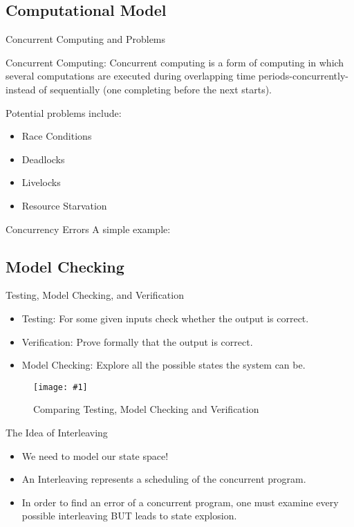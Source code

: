 \documentclass[9pt]{beamer}
\newcommand{\trace}[2]{
\begin{figure}[H]
\centering
\texttt{[image: \#1]}
\caption{#2}
\label{#2}
\end{figure}
}
\newcommand{\Code}[2]{
  \begin{minipage}{\linewidth}
  
  \label{#2}
  \end{minipage}
 }
\begin{document}
\subsection{Computational Model}
\begin{frame}{Concurrent Computing and Problems}

Concurrent Computing: Concurrent computing is a form of computing in which several computations are executed during
overlapping time periods-concurrently-instead of sequentially (one completing before the next starts).

Potential problems include:
\begin{itemize}
\item Race Conditions
\item Deadlocks
\item Livelocks
\item Resource Starvation
\end{itemize}

\end{frame}

\begin{frame}{Concurrency Errors}
A simple example:

\Code{../code/zero.c}{Example of non-concurrency error}

\Code{../code/zeroconc.c}{Example of concurrency error}

\end{frame}

\subsection{Model Checking}
\begin{frame}{Testing, Model Checking, and Verification}
\begin{itemize}
\item Testing: For some given inputs check whether the output is correct.
\item Verification: Prove formally that the output is correct.
\item Model Checking: Explore all the possible states the system can be.

\end{itemize}

\trace{../img/testmodver.png}{Comparing Testing, Model Checking and Verification}
    
\end{frame}

\begin{frame}{The Idea of Interleaving}

\begin{itemize}
    \item We need to model our state space!
    \item An Interleaving represents a scheduling of the concurrent program.
    \item In order to find an error of a concurrent program, one must examine every possible interleaving BUT leads to state explosion.
\end{itemize}
    

\end{frame}
\end{document}

